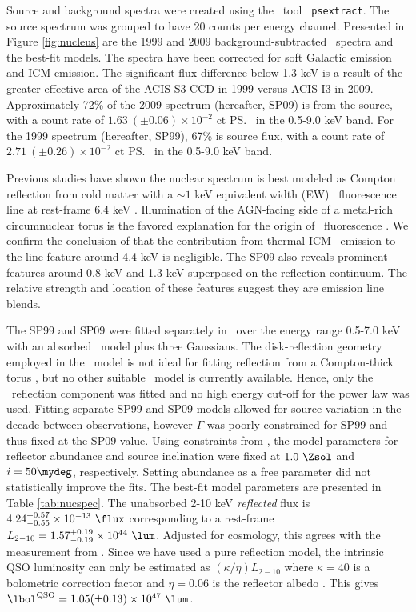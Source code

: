 \documentclass[useAMS,usenatbib]{mn2e}
\begin{document}
Source and background spectra were created using the \ciao\ tool {\tt
  psextract}. The source spectrum was grouped to have 20 counts per
energy channel. Presented in Figure \ref{fig:nucleus} are the 1999 and
2009 background-subtracted \chandra\ spectra and the best-fit
models. The spectra have been corrected for soft Galactic emission and
ICM emission. The significant flux difference below 1.3 keV is a
result of the greater effective area of the ACIS-S3 CCD in 1999 versus
ACIS-I3 in 2009. Approximately 72\% of the 2009 spectrum (hereafter,
SP09) is from the source, with a count rate of $1.63 ~(\pm 0.06)
\times 10^{-2}$ ct \ps\ in the 0.5-9.0 keV band. For the 1999 spectrum
(hereafter, SP99), 67\% is source flux, with a count rate of $2.71
~(\pm 0.26) \times 10^{-2}$ ct \ps\ in the 0.5-9.0 keV band.

Previous studies have shown the nuclear spectrum is best modeled as
Compton reflection from cold matter with a $\sim 1$ keV equivalent
width (EW) \feka\ fluorescence line at rest-frame 6.4 keV
\citep{2000AJ....120..562T, 2001MNRAS.321L..15I}. Illumination of the
AGN-facing side of a metal-rich circumnuclear torus is the favored
explanation for the origin of \feka\ fluorescence
\citep{1994ApJ...420L..57K}. We confirm the conclusion of
\citet{2001MNRAS.321L..15I} that the contribution from thermal ICM
\feka\ emission to the line feature around 4.4 keV is negligible. The
SP09 also reveals prominent features around 0.8 keV and 1.3 keV
superposed on the reflection continuum. The relative strength and
location of these features suggest they are emission line blends.

The SP99 and SP09 were fitted separately in \xspec\ over the energy
range 0.5-7.0 keV with an absorbed \pexrav\ model \citep{pexrav} plus
three Gaussians. The disk-reflection geometry employed in the
\pexrav\ model is not ideal for fitting reflection from a
Compton-thick torus \citep{2009MNRAS.397.1549M}, but no other suitable
\xspec\ model is currently available. Hence, only the
\pexrav\ reflection component was fitted and no high energy cut-off
for the power law was used. Fitting separate SP99 and SP09 models
allowed for source variation in the decade between observations,
however $\Gamma$ was poorly constrained for SP99 and thus fixed at the
SP09 value. Using constraints from \citet{2000AJ....120..562T}, the
model parameters for reflector abundance and source inclination were
fixed at $1.0 ~\Zsol$ and $i = 50\mydeg$, respectively. Setting
abundance as a free parameter did not statistically improve the
fits. The best-fit model parameters are presented in Table
\ref{tab:nucspec}. The unabsorbed 2-10 keV {\it{reflected}} flux is
$4.24^{+0.57}_{-0.55} \times 10^{-13} ~\flux$ corresponding to a
rest-frame $L_{2-10} = 1.57^{+0.19}_{-0.19} \times 10^{44}
~\lum$. Adjusted for cosmology, this agrees with the measurement from
\citet{2001MNRAS.321L..15I}. Since we have used a pure reflection
model, the intrinsic QSO luminosity can only be estimated as
$(\kappa/\eta) L_{2-10}$ where $\kappa = 40$ is a bolometric
correction factor \citep{2007MNRAS.381.1235V} and $\eta = 0.06$ is the
reflector albedo \citep{2009MNRAS.397.1549M}. This gives $\lqso = 1.05
(\pm 0.13) \times 10^{47} ~\lum$.
\end{document}
